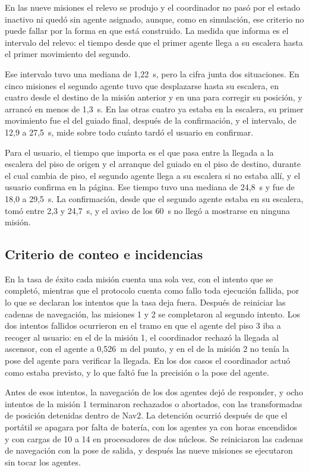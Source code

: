 En las nueve misiones el relevo se produjo y el coordinador no pasó por el estado inactivo ni quedó sin agente asignado, aunque, como en simulación, ese criterio no puede fallar por la forma en que está construido. La medida que informa es el intervalo del relevo: el tiempo desde que el primer agente llega a su escalera hasta el primer movimiento del segundo.

Ese intervalo tuvo una mediana de 1,22~s, pero la cifra junta dos situaciones. En cinco misiones el segundo agente tuvo que desplazarse hasta su escalera, en cuatro desde el destino de la misión anterior y en una para corregir su posición, y arrancó en menos de 1,3~s. En las otras cuatro ya estaba en la escalera, su primer movimiento fue el del guiado final, después de la confirmación, y el intervalo, de 12,9 a 27,5~s, mide sobre todo cuánto tardó el usuario en confirmar.

Para el usuario, el tiempo que importa es el que pasa entre la llegada a la escalera del piso de origen y el arranque del guiado en el piso de destino, durante el cual cambia de piso, el segundo agente llega a su escalera si no estaba allí, y el usuario confirma en la página. Ese tiempo tuvo una mediana de 24,8~s y fue de 18,0 a 29,5~s. La confirmación, desde que el segundo agente estaba en su escalera, tomó entre 2,3 y 24,7~s, y el aviso de los 60~s no llegó a mostrarse en ninguna misión.

\subsection{Criterio de conteo e incidencias}

En la tasa de éxito cada misión cuenta una sola vez, con el intento que se completó, mientras que el protocolo cuenta como fallo toda ejecución fallida, por lo que se declaran los intentos que la tasa deja fuera. Después de reiniciar las cadenas de navegación, las misiones 1 y 2 se completaron al segundo intento. Los dos intentos fallidos ocurrieron en el tramo en que el agente del piso 3 iba a recoger al usuario: en el de la misión 1, el coordinador rechazó la llegada al ascensor, con el agente a 0,526~m del punto, y en el de la misión 2 no tenía la pose del agente para verificar la llegada. En los dos casos el coordinador actuó como estaba previsto, y lo que faltó fue la precisión o la pose del agente.

Antes de esos intentos, la navegación de los dos agentes dejó de responder, y ocho intentos de la misión 1 terminaron rechazados o abortados, con las transformadas de posición detenidas dentro de Nav2. La detención ocurrió después de que el portátil se apagara por falta de batería, con los agentes ya con horas encendidos y con cargas de 10 a 14 en procesadores de dos núcleos. Se reiniciaron las cadenas de navegación con la pose de salida, y después las nueve misiones se ejecutaron sin tocar los agentes.

